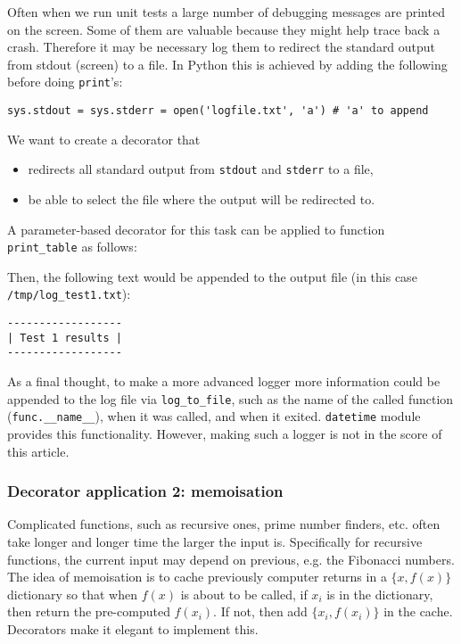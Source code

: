 \documentclass[a4paper]{article}
\begin{document}
Often when we run unit tests a large number of debugging messages are printed on the screen. Some of them are valuable because they might help trace back a crash. Therefore it may be necessary log them  to redirect the standard output from stdout (screen) to a file. In Python this is achieved by adding the following before doing \texttt{print}'s:
\begin{verbatim}
sys.stdout = sys.stderr = open('logfile.txt', 'a') # 'a' to append
\end{verbatim}
We want to create a decorator that 
\begin{itemize}
    \item redirects all standard output from \texttt{stdout} and \texttt{stderr} to a file,
    \item be able to select the file where the output will be redirected to.
\end{itemize}
A parameter-based decorator for this task can be applied to function \texttt{print\_table} as follows:

Then, the following text would be appended to the output file (in this case \texttt{/tmp/log\_test1.txt}):
\begin{verbatim}
------------------
| Test 1 results |
------------------
\end{verbatim}
As a final thought, to make a more advanced logger more information could be appended to the log file via \texttt{log\_to\_file}, such as the name of the called function (\texttt{func.\_\_name\_\_}), when it was called, and when it exited. \texttt{datetime} module provides this functionality. However, making such a logger is not in the score of this article.


\subsubsection{Decorator application 2: memoisation}

Complicated functions, such as recursive ones, prime number finders, etc. often take longer and longer time the larger the input is. Specifically for recursive functions, the current input may depend on previous, e.g. the Fibonacci numbers. The idea of memoisation is to cache previously computer returns in a $\{x, f(x)\}$ dictionary so that when $f(x)$ is about to be called, if $x_i$ is in the dictionary, then return the pre-computed $f(x_i)$. If not, then add $\{x_i, f(x_i)\}$ in the cache. Decorators make it elegant to implement this.
\end{document}
